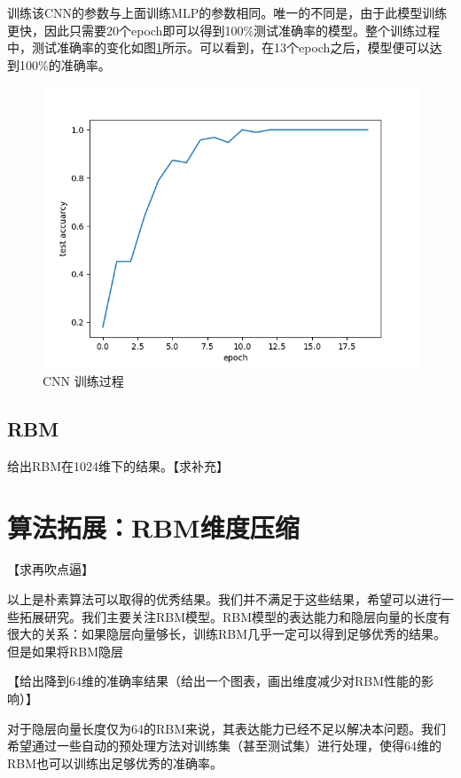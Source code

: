 \documentclass[UTF8]{ctexart}
\begin{document}
训练该CNN的参数与上面训练MLP的参数相同。唯一的不同是，由于此模型训练更快，因此只需要20个epoch即可以得到100\%测试准确率的模型。整个训练过程中，测试准确率的变化如图\ref{cnn}所示。可以看到，在13个epoch之后，模型便可以达到100\%的准确率。

\begin{figure}
	\centering
	\includegraphics{cnn}
	\caption{CNN 训练过程}
	\label{cnn}
\end{figure}

\subsection{RBM}

给出RBM在1024维下的结果。【求补充】

\section{算法拓展：RBM维度压缩}

【求再吹点逼】

以上是朴素算法可以取得的优秀结果。我们并不满足于这些结果，希望可以进行一些拓展研究。我们主要关注RBM模型。RBM模型的表达能力和隐层向量的长度有很大的关系：如果隐层向量够长，训练RBM几乎一定可以得到足够优秀的结果。但是如果将RBM隐层

【给出降到64维的准确率结果（给出一个图表，画出维度减少对RBM性能的影响）】

对于隐层向量长度仅为64的RBM来说，其表达能力已经不足以解决本问题。我们希望通过一些自动的预处理方法对训练集（甚至测试集）进行处理，使得64维的RBM也可以训练出足够优秀的准确率。
\end{document}

